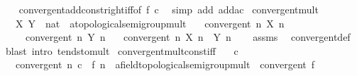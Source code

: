 \begin{isabellebody}
%
\isadelimproof
\ \ %
\endisadelimproof
%
\isatagproof
{}\isamarkupfalse%
\ convergent{\isacharunderscore}{\kern0pt}add{\isacharunderscore}{\kern0pt}const{\isacharunderscore}{\kern0pt}right{\isacharunderscore}{\kern0pt}iff{\isacharbrackleft}{\kern0pt}of\ f\ {\isachardoublequoteopen}{\isacharminus}{\kern0pt}c{\isachardoublequoteclose}{\isacharbrackright}{\kern0pt}\ \isamarkupfalse%
\ {\isacharparenleft}{\kern0pt}simp\ add{\isacharcolon}{\kern0pt}\ add{\isacharunderscore}{\kern0pt}ac{\isacharparenright}{\kern0pt}%
\endisatagproof
{\isafoldproof}%
%
\isadelimproof
\isanewline
%
\endisadelimproof
\isanewline
{}\isamarkupfalse%
\ convergent{\isacharunderscore}{\kern0pt}mult{\isacharcolon}{\kern0pt}\isanewline
\ \ \ X\ Y\ {\isacharcolon}{\kern0pt}{\isacharcolon}{\kern0pt}\ {\isachardoublequoteopen}nat\ {\isasymRightarrow}\ {\isacharprime}{\kern0pt}a{\isacharcolon}{\kern0pt}{\isacharcolon}{\kern0pt}topological{\isacharunderscore}{\kern0pt}semigroup{\isacharunderscore}{\kern0pt}mult{\isachardoublequoteclose}\isanewline
\ \ \ {\isachardoublequoteopen}convergent\ {\isacharparenleft}{\kern0pt}{\isasymlambda}n{\isachardot}{\kern0pt}\ X\ n{\isacharparenright}{\kern0pt}{\isachardoublequoteclose}\isanewline
\ \ \ \ \ {\isachardoublequoteopen}convergent\ {\isacharparenleft}{\kern0pt}{\isasymlambda}n{\isachardot}{\kern0pt}\ Y\ n{\isacharparenright}{\kern0pt}{\isachardoublequoteclose}\isanewline
\ \ \ {\isachardoublequoteopen}convergent\ {\isacharparenleft}{\kern0pt}{\isasymlambda}n{\isachardot}{\kern0pt}\ X\ n\ {\isacharasterisk}{\kern0pt}\ Y\ n{\isacharparenright}{\kern0pt}{\isachardoublequoteclose}\isanewline
%
\isadelimproof
\ \ %
\endisadelimproof
%
\isatagproof
{}\isamarkupfalse%
\ assms\ \isamarkupfalse%
\ convergent{\isacharunderscore}{\kern0pt}def\ \isamarkupfalse%
\ {\isacharparenleft}{\kern0pt}blast\ intro{\isacharcolon}{\kern0pt}\ tendsto{\isacharunderscore}{\kern0pt}mult{\isacharparenright}{\kern0pt}%
\endisatagproof
{\isafoldproof}%
%
\isadelimproof
\isanewline
%
\endisadelimproof
\isanewline
{}\isamarkupfalse%
\ convergent{\isacharunderscore}{\kern0pt}mult{\isacharunderscore}{\kern0pt}const{\isacharunderscore}{\kern0pt}iff{\isacharcolon}{\kern0pt}\isanewline
\ \ \ {\isachardoublequoteopen}c\ {\isasymnoteq}\ {}{\isachardoublequoteclose}\isanewline
\ \ \ {\isachardoublequoteopen}convergent\ {\isacharparenleft}{\kern0pt}{\isasymlambda}n{\isachardot}{\kern0pt}\ c\ {\isacharasterisk}{\kern0pt}\ f\ n\ {\isacharcolon}{\kern0pt}{\isacharcolon}{\kern0pt}\ {\isacharprime}{\kern0pt}a{\isacharcolon}{\kern0pt}{\isacharcolon}{\kern0pt}{\isacharbraceleft}{\kern0pt}field{\isacharcomma}{\kern0pt}topological{\isacharunderscore}{\kern0pt}semigroup{\isacharunderscore}{\kern0pt}mult{\isacharbraceright}{\kern0pt}{\isacharparenright}{\kern0pt}\ {\isasymlongleftrightarrow}\ convergent\ f{\isachardoublequoteclose}\isanewline

\end{isabellebody}
